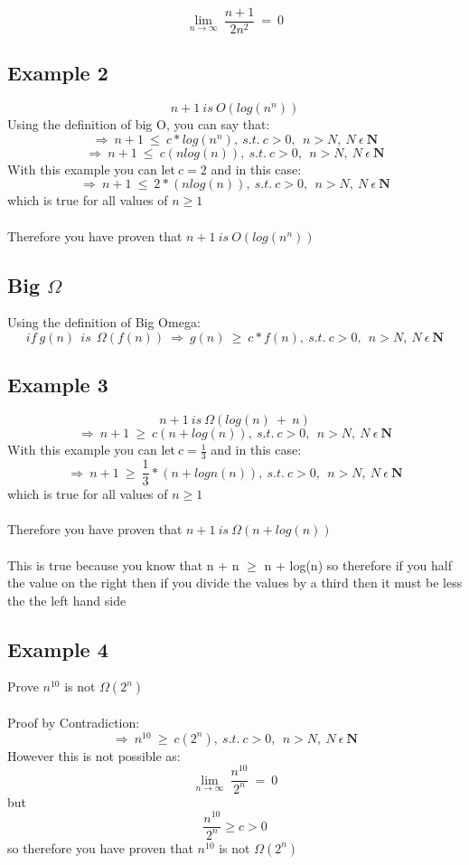 \documentclass{article}
\begin{document}
$$\lim_{n \to \infty} \ \frac{n+1}{2n^2} \ = \ 0 $$

\subsection{Example 2}
$$ n + 1\ is \ O(log(n^n)) $$ 
Using the definition of big O, you can say that:
$$ \Rightarrow \ n + 1 \ \leq \ c*log(n^n), \ s.t.\ c > 0, \ \ n > N, \ N \ \epsilon \ \mathbf{N}$$
$$ \Rightarrow \ n + 1 \ \leq \ c(nlog(n)), \ s.t.\ c > 0, \ \ n > N, \ N \ \epsilon \ \mathbf{N}$$
With this example you can let$\ c= 2$ and in this case:
$$ \Rightarrow \ n + 1 \ \leq \ 2*(nlog(n)), \ s.t.\ c > 0, \ \ n > N, \ N \ \epsilon \ \mathbf{N}$$
which is true for all values of $ n \ge 1 $ \\ \\
Therefore you have proven that $ n + 1\ is \ O(log(n^n)) $

\subsection{Big $\Omega$}
Using the definition of Big Omega:
$$ if \ g(n)\ \ is\ \ \Omega(f(n))\ \Rightarrow \ g(n)\ \ge \ c*f(n), \ s.t.\ c > 0, \ \ n > N, \ N \ \epsilon \ \mathbf{N} $$

\subsection{Example 3}
$$ n + 1\ is \ \Omega(log(n) \ + \ n) $$
$$ \Rightarrow \ n + 1 \ \ge \ c(n + log(n)), \ s.t.\ c > 0, \ \ n > N, \ N \ \epsilon \ \mathbf{N}$$
With this example you can let$\ c= \frac{1}{3}$ and in this case:
$$ \Rightarrow \ n + 1 \ \ge \ \frac{1}{3}*(n + logn(n)), \ s.t.\ c > 0, \ \ n > N, \ N \ \epsilon \ \mathbf{N}$$
which is true for all values of $ n \ge 1 $ \\ \\
Therefore you have proven that $ n + 1\ is \ \Omega(n+log(n)) $
\\ \\ This is true because you know that n + n $\ge$ n + log(n) so therefore if you half the value on the right then if you divide the values by a third then it must be less the the left hand side

\subsection{Example 4}
Prove $n^{10}$ is not $\Omega(2^n)$ \\ \\
Proof by Contradiction: 
$$ \Rightarrow \ n^{10} \ \ge \ c(2^n), \ s.t.\ c > 0, \ \ n > N, \ N \ \epsilon \ \mathbf{N}$$
However this is not possible as:
$$ \lim_{n \to \infty} \ \frac{n^{10}}{2^n} \ = \ 0 $$ 
but 
$$ \frac{n^{10}}{2^n} \ge c > 0$$
so therefore you have proven that $n^{10}$ is not $\Omega(2^n)$
\end{document}
